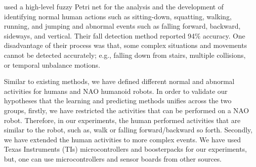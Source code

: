 \documentclass[letterpaper]{article}
\begin{document}
\begin{sloppy}
\cite{Shen2015390} used a  high-level fuzzy Petri net for the analysis and the development of 
identifying normal human actions such as sitting-down, squatting, walking, running, and jumping and 
abnormal events such as falling forward, backward, sideways, and vertical. Their fall detection 
method reported 94\% accuracy. One disadvantage of their process was that, some complex situations 
and movements cannot be detected accurately; e.g., falling down from  stairs, multiple collisions, 
or temporal unbalance motions.

Similar to existing methods, we have defined different normal and abnormal activities for humans 
and NAO humanoid robots. In order to validate our hypotheses that the learning and predicting 
methods unifies across the two groups, firstly, we have restricted the activities that can be 
performed on a NAO robot. Therefore, in our experiments, the human performed activities that are 
similar to the robot, such as, walk or falling forward/backward so forth. Secondly, we have 
extended the human activities to more complex events.  We have used Texas Instruments 
(TIs)  microcontrollers and boosterpacks for our experiments, 
but, one can use microcontrollers and  sensor boards from other sources.  




\end{sloppy}
\end{document}
